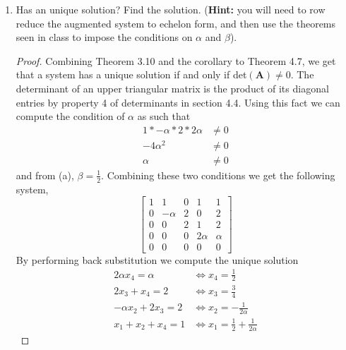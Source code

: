\documentclass[11pt]{scrartcl}
\begin{document}
\begin{enumerate}[label=\alph*.]
{\begin{proof}
			 This is when $\beta \neq \frac12$.
		      We observe that there will be no conditions on $\alpha$.
	      \end{proof}
	      }
	\item{
	      Has an unique solution? Find the solution.
	      (\textbf{Hint:} you will need to row reduce the augmented system to echelon form,
	      and then use the theorems seen in class to impose the conditions on $\alpha$ and $\beta$).
	      \begin{proof}
		      Combining Theorem 3.10 and the corollary to Theorem 4.7, we get that a system has a
		      unique solution if and only if det$(\mathbf{A}) \neq 0$.
		      The determinant of an upper triangular matrix is the product of its diagonal
		      entries by property 4 of determinants in section 4.4.
		      Using this fact we can compute the condition of $\alpha$ as such that
		      \begin{align*}
			      1*-\alpha*2*2\alpha & \neq 0 \\
			      -4\alpha^2          & \neq 0 \\
			      \alpha              & \neq 0
		      \end{align*}
		      and from (a), $\beta = \frac12$. Combining these two conditions we get the following system,
		      \[
			      \left [ \begin{array}{cccc|c}
					      1 & 1        & 0 & 1       & 1      \\
					      0 & - \alpha & 2 & 0       & 2      \\
					      0 & 0        & 2 & 1       & 2      \\
					      0 & 0        & 0 & 2\alpha & \alpha \\
					      0 & 0        & 0 & 0       & 0
				      \end{array} \right ]
		      \]
			  By performing back substitution we compute the unique solution
			  \begin{align*}
				2\alpha x_4 = \alpha & \Leftrightarrow x_4 = \frac12 \\
				2x_3 + x_4 = 2 & \Leftrightarrow x_3 = \frac34   \\
				-\alpha x_2 + 2x_3 = 2 & \Leftrightarrow x_2  = -\frac{1}{2\alpha}\\
				x_1 + x_2 + x_4 = 1  & \Leftrightarrow x_ 1 =\frac12 + \frac{1}{2\alpha}
			\end{align*}


\end{proof}}
\end{enumerate}
\end{document}
